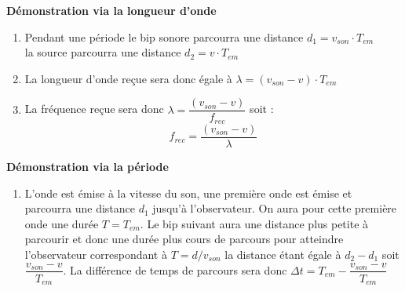 \documentclass[a4paper,11pt,fleqn]{article}%
\begin{document}
\textbf{Démonstration via la longueur d'onde}
\begin{enumerate}
	\item Pendant une période le bip sonore parcourra une distance $d_1 = v_{son} \cdot T_{em}$\\
	la source parcourra une distance $d_2 = v \cdot T_{em}$
	\item La longueur d'onde reçue sera donc égale à $\lambda = (v_{son} - v) \cdot T_{em}$
	\item La fréquence reçue sera donc $\lambda = \dfrac{(v_{son} - v)} {f_{rec}}$ soit : $$f_{rec} = \dfrac{(v_{son} - v)} {\lambda}$$

\end{enumerate}
\textbf{Démonstration via la période}
\begin{enumerate}
	\item L'onde est émise à la vitesse du son, une première onde est émise et parcourra une distance $d_1$ jusqu'à l'observateur. On aura pour cette première onde une durée $T = T_{em}$. Le bip suivant aura une distance plus petite à parcourir et donc une durée plus cours de parcours pour atteindre l'observateur correspondant à $T = d/v_{son}$ la distance étant égale à $d_2 - d_1$ soit $\dfrac{v_{son}-v}{T_{em}}$. La différence de temps de parcours sera donc $\Delta t = T_{em} - \dfrac{v_{son}-v}{T_{em}}$
\end{enumerate}
\end{document}
